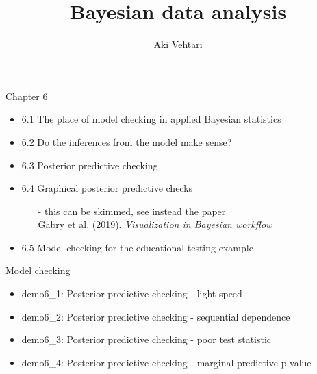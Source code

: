 \documentclass[t]{beamer}
\title[]{Bayesian data analysis}
\subtitle{}
\author{Aki Vehtari}
\institute[Aalto]{}
\begin{document}
\begin{frame}{Chapter 6}

  \begin{itemize}
  \item 6.1 The place of model checking in applied Bayesian statistics
  \item 6.2 Do the inferences from the model make sense?
  \item 6.3 Posterior predictive checking
  \item {\color{gray} 6.4 Graphical posterior predictive checks}    
    \begin{itemize}
    \item[-] this can be skimmed, see instead the paper\\ Gabry et al. (2019). \href{https://doi.org/10.1111/rssa.12378}{\textit{Visualization in Bayesian workflow}}
  \end{itemize}
\item 6.5 Model checking for the educational testing example
  \end{itemize}
  
\end{frame}

\begin{frame}
  
  {\Large\color{navyblue} Model checking}

  \begin{itemize}
  \item demo6\_1: Posterior predictive checking - light speed
  \item demo6\_2: Posterior predictive checking - sequential dependence
  \item demo6\_3: Posterior predictive checking - poor test statistic
  \item demo6\_4: Posterior predictive checking - marginal predictive p-value
  \end{itemize}

\end{frame}
\end{document}
